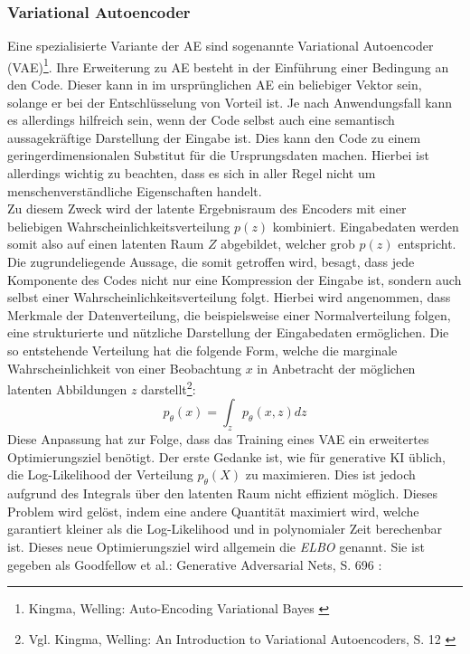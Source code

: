 \subsubsection{Variational Autoencoder}

Eine spezialisierte Variante der \ac{AE} sind sogenannte Variational Autoencoder (\ac{VAE})\footnote{
    Kingma, Welling: Auto-Encoding Variational Bayes
    \cite{kingma2013auto}
}. Ihre Erweiterung zu \ac{AE} besteht in der Einführung einer Bedingung an den Code. Dieser kann in im ursprünglichen \ac{AE} ein beliebiger Vektor sein, solange er bei der Entschlüsselung von Vorteil ist. Je nach Anwendungsfall kann es allerdings hilfreich sein, wenn der Code selbst auch eine semantisch aussagekräftige Darstellung der Eingabe ist. Dies kann den Code zu einem geringerdimensionalen Substitut für die Ursprungsdaten machen. Hierbei ist allerdings wichtig zu beachten, dass es sich in aller Regel nicht um menschenverständliche Eigenschaften handelt. \\
Zu diesem Zweck wird der latente Ergebnisraum des Encoders mit einer beliebigen Wahrscheinlichkeitsverteilung $p(z)$ kombiniert. Eingabedaten werden somit also auf einen latenten Raum $Z$ abgebildet, welcher grob $p(z)$ entspricht. \\
Die zugrundeliegende Aussage, die somit getroffen wird, besagt, dass jede Komponente des Codes nicht nur eine Kompression der Eingabe ist, sondern auch selbst einer Wahrscheinlichkeitsverteilung folgt. Hierbei wird angenommen, dass Merkmale der Datenverteilung, die beispielsweise einer Normalverteilung folgen, eine strukturierte und nützliche Darstellung der Eingabedaten ermöglichen. Die so entstehende Verteilung hat die folgende Form, welche die marginale Wahrscheinlichkeit von einer Beobachtung $x$ in Anbetracht der möglichen latenten Abbildungen $z$ darstellt\footnote{
    Vgl. Kingma, Welling: An Introduction to Variational Autoencoders, S. 12
    \cite{Kingma_2019}
}:
\begin{equation}
    p_\theta(x) = \int_z p_\theta(x, z) dz
\end{equation}
Diese Anpassung hat zur Folge, dass das Training eines \ac{VAE} ein erweitertes Optimierungsziel benötigt. Der erste Gedanke ist, wie für generative \ac{KI} üblich, die Log-Likelihood der Verteilung $p_\theta(X)$ zu maximieren. Dies ist jedoch aufgrund des Integrals über den latenten Raum nicht effizient möglich. Dieses Problem wird gelöst, indem eine andere Quantität maximiert wird, welche garantiert kleiner als die Log-Likelihood und in polynomialer Zeit berechenbar ist. Dieses neue Optimierungsziel wird allgemein die \textit{\ac{ELBO}} genannt. Sie ist gegeben als{
    Goodfellow et al.: Generative Adversarial Nets, S. 696
    \cite{goodfellow2014generativeadversarialnetworks}
}:
